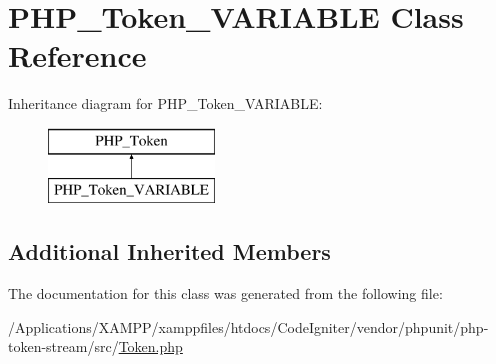 \hypertarget{class_p_h_p___token___v_a_r_i_a_b_l_e}{}\section{P\+H\+P\+\_\+\+Token\+\_\+\+V\+A\+R\+I\+A\+B\+LE Class Reference}
\label{class_p_h_p___token___v_a_r_i_a_b_l_e}
Inheritance diagram for P\+H\+P\+\_\+\+Token\+\_\+\+V\+A\+R\+I\+A\+B\+LE\+:\begin{figure}[H]
\begin{center}
\leavevmode
\includegraphics[height=2.000000cm]{class_p_h_p___token___v_a_r_i_a_b_l_e}
\end{center}
\end{figure}
\subsection*{Additional Inherited Members}


The documentation for this class was generated from the following file\+:\begin{DoxyCompactItemize}
\item 
/\+Applications/\+X\+A\+M\+P\+P/xamppfiles/htdocs/\+Code\+Igniter/vendor/phpunit/php-\/token-\/stream/src/\mbox{\hyperlink{_token_8php}{Token.\+php}}\end{DoxyCompactItemize}
